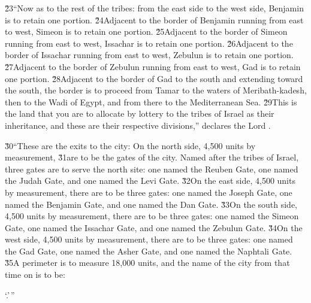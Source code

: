 \v{23}``Now as to the rest of the tribes: from the east side to the west side, Benjamin is to retain one portion. \v{24}Adjacent to the border of Benjamin running from east to west, Simeon is to retain one portion. \v{25}Adjacent to the border of Simeon running from east to west, Issachar is to retain one portion. \v{26}Adjacent to the border of Issachar running from east to west, Zebulun is to retain one portion. \v{27}Adjacent to the border of Zebulun running from east to west, Gad is to retain one portion. \v{28}Adjacent to the border of Gad to the south and extending toward the south, the border is to proceed from Tamar to the waters of Meribath-kadesh, then to the Wadi of Egypt, and from there to the Mediterranean Sea. \v{29}This is the land that you are to allocate by lottery to the tribes of Israel as their inheritance, and these are their respective divisions,'' declares the Lord .

\v{30}``These are the exits to the city: On the north side, 4,500 units by measurement, \v{31}are to be the gates of the city. Named after the tribes of Israel, three gates are to serve the north site: one named the Reuben Gate, one named the Judah Gate, and one named the Levi Gate. \v{32}On the east side, 4,500 units by measurement, there are to be three gates: one named the Joseph Gate, one named the Benjamin Gate, and one named the Dan Gate. \v{33}On the south side, 4,500 units by measurement, there are to be three gates: one named the Simeon Gate, one named the Issachar Gate, and one named the Zebulun Gate. \v{34}On the west side, 4,500 units by measurement, there are to be three gates: one named the Gad Gate, one named the Asher Gate, and one named the Naphtali Gate. \v{35}A perimeter is to measure 18,000 units, and the name of the city from that time on is to be:

\begin{poetry}
\poeml `.'\,''\end{poetry}
